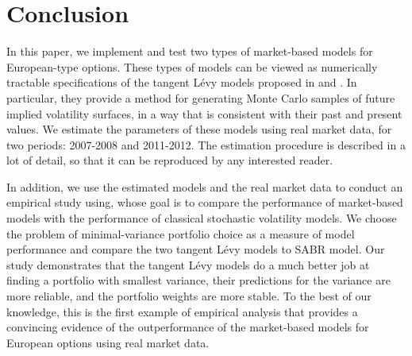 \documentclass{article}
\numberwithin{equation}{section}
\begin{document}
\section{Conclusion}\label{se:conclusion}
In this paper, we implement and test two types of market-based models for European-type options. These types of models can be viewed as numerically tractable specifications of the tangent L\'evy models proposed in \cite{carmona2010tangentlevy} and \cite{carmona2011tangentlevy}. In particular, they provide a method for generating Monte Carlo samples of future implied volatility surfaces, in a way that is consistent with their past and present values.
We estimate the parameters of these models using real market data, for two periods: 2007-2008 and 2011-2012. The estimation procedure is described in a lot of detail, so that it can be reproduced by any interested reader. 

In addition, we use the estimated models and the real market data to conduct an empirical study using, whose goal is to compare the performance of market-based models with the performance of classical stochastic volatility models. We choose the problem of minimal-variance portfolio choice as a measure of model performance and compare the two tangent L\'evy models to SABR model. Our study demonstrates that the tangent L\'{e}vy models do a much better job at finding a portfolio with smallest variance, their predictions for the variance are more reliable, and the portfolio weights are more stable. To the best of our knowledge, this is the first example of empirical analysis that provides a convincing evidence of the outperformance of the market-based models for European options using real market data.
\end{document}
